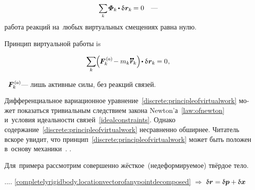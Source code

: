 \begin{otherlanguage}{russian}
\nopagebreak\begin{equation}\label{idealconstraints}
\scalebox{0.9}{$\displaystyle \sum_{\smash{k}}$} \hspace{.2ex} \mathboldPhi_k \hspace{-0.2ex} \dotp \variation{\hspace{.1ex}\locationvector_k} \hspace{-0.16ex} = 0
\quad \textrm{---}
\vspace{-0.25em}\end{equation}
\noindent
работа реакций на~любых виртуальных смещениях равна нулю.

Принцип виртуальной работы is

\nopagebreak\vspace{-0.1em}\begin{equation}\label{discrete:principleofvirtualwork}
\displaystyle \sum_{\smash{k}} \hspace{-0.1ex} \Bigl( \hspace{-0.1ex} \bm{F}_{k}^{\smthactive} \hspace{-0.2ex} - m_k \mathdotdotabove{\locationvector}_k \Bigr) \hspace{-0.3ex} \dotp \variation{\hspace{.1ex}\locationvector_k} \hspace{-0.1ex} = 0
\hspace{.1ex} ,
\vspace{-0.3em}
\end{equation}

\noindent
{}~${\bm{F}_{k}^{\smthactive}}$\:---
лишь активные силы, без реакций связей.

Дифференциальное вариационное уравнение~\eqref{discrete:principleofvirtualwork}
может показаться
тривиальным следствием
закона Newton’а~\eqref{law:ofnewton}
и~условия идеальности связей~\eqref{idealconstraints}.
Однако
содержание~\eqref{discrete:principleofvirtualwork}
несравненно обширнее.
Читатель вскоре увидит, что
принцип~\eqref{discrete:principleofvirtualwork}
может быть положен
в~основу механики~\cite{gantmacher-analyticalmechanics}.
\ru{,}
\ru{,}
.

Для~примера рассмотрим совершенно жёсткое~(недеформируемое) твёрдое тело.

.... \eqref{completelyrigidbody.locationvectorofanypointdecomposed} ${\Rightarrow}$
${\updelta\hspace{-0.1ex}\bm{r} = \updelta\hspace{-0.1ex}\bm{p} + \updelta\hspace{-0.1ex}\bm{x}}$


\end{otherlanguage}
